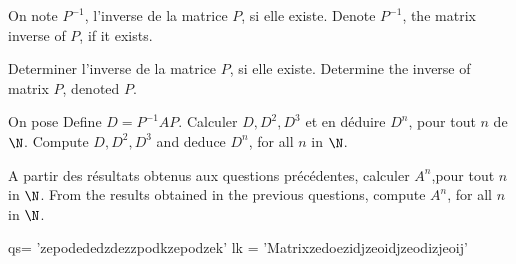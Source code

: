 






\iffrancais
On note $P^{-1}$, l'inverse de la matrice $P$, si elle existe.
\else
Denote  $P^{-1}$, the matrix inverse of $P$, if it exists.
\fi

\ben

\item 
\iffrancais
Determiner l'inverse de la matrice $P$, si elle existe.
\else
Determine the inverse of matrix $P$, denoted $P$.
\fi



\item
\iffrancais
On pose 
\else
Define
\fi
$D=P^{-1}AP$. 
%
%
\iffrancais
Calculer $D, D^{2}, D^{3}$ et en déduire $D^{n}$, pour tout $n$ de $\N$.
\else
Compute $D, D^{2}, D^{3}$ and deduce $D^{n}$, for all $n$ in $\N$.
\fi


\item
\iffrancais
A partir des résultats obtenus aux questions précédentes, calculer $A^{n}$,pour tout  $n$ in $\N$.
\else
From the results obtained in the previous questions, compute  $A^{n}$, for all $n$ in $\N$.
\fi


\begin{sympycode}
qs= 'zepodededzdezzpodkzepodzek'
lk = 'Matrixzedoezidjzeoidjzeodizjeoij'
\end{sympycode}


\een







